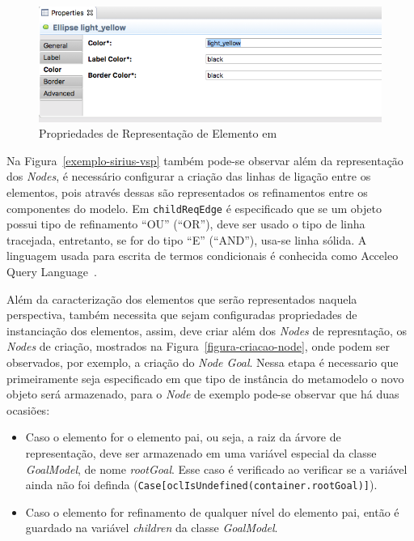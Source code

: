 \begin{figure}[h]
	\centering
	\includegraphics[width=1\textwidth]{figuras/unagi/exemplo-propriedades-personalizacao.png}
	\caption{Propriedades de Representação de Elemento em \sirius}
	\label{figura-propriedades-personalizacao}
\end{figure}

Na Figura~\ref{exemplo-sirius-vsp} também pode-se observar além da representação dos \textit{Nodes}, é necessário configurar a criação das linhas de ligação entre os elementos, pois através dessas são representados os refinamentos entre os componentes do modelo. Em \texttt{childReqEdge} é especificado que se um objeto possui tipo de refinamento ``OU'' (``OR''), deve ser usado o tipo de linha tracejada, entretanto, se for do tipo ``E'' (``AND''), usa-se linha sólida. A linguagem usada para escrita de termos condicionais é conhecida como Acceleo Query Language~\cite{musset2006acceleo}.

Além da caracterização dos elementos que serão representados naquela perspectiva, \sirius também necessita que sejam configuradas propriedades de instanciação dos elementos, assim, deve criar além dos \textit{Nodes} de represntação, os \textit{Nodes} de criação, mostrados na Figura~\ref{figura-criacao-node}, onde podem ser observados, por exemplo, a criação do \textit{Node Goal}. Nessa etapa é necessario que primeiramente seja especificado em que tipo de instância do metamodelo o novo objeto será armazenado, para o \textit{Node} de exemplo pode-se observar que há duas ocasiões:
\begin{itemize}
	\item Caso o elemento for o elemento pai, ou seja, a raiz da árvore de representação, deve ser armazenado em uma variável especial da classe \textit{GoalModel}, de nome \textit{rootGoal}. Esse caso é verificado ao verificar se a variável ainda não foi definda (\texttt{Case[oclIsUndefined(container.rootGoal)]}).
	\item Caso o elemento for refinamento de qualquer nível do elemento pai, então é guardado na variável \textit{children} da classe \textit{GoalModel}.
\end{itemize}

